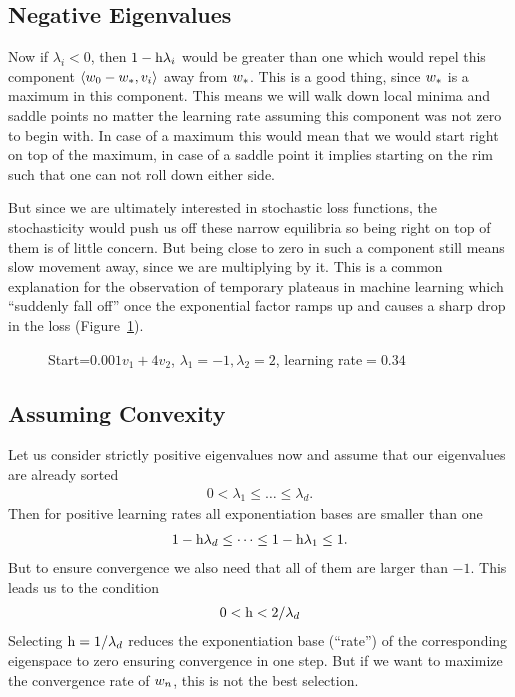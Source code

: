 \subsection{Negative Eigenvalues}\label{subsec: Negative Eigenvalues}

Now if \(\lambda_i<0\), then \(1-\text{h}\lambda_i\) would be greater
than one which would repel this component \(\langle w_0 - w_*,
v_i\rangle\) away from \(w_*\). This is a good thing, since \(w_*\)
is a maximum in this component. This means we will walk down local minima and
saddle points no matter the learning rate assuming  this component  was not
zero to begin with. In case of a maximum this would mean that we would start
right on top of the maximum, in case of a saddle point it implies starting on
the rim such that one can not roll down either side.

But since we are ultimately interested in stochastic loss functions, the
stochasticity would push us off these narrow equilibria so being right on
top of them is of little concern. But being close to zero in such a component
still means slow movement away, since we are multiplying by it. This is a
common explanation for the observation of temporary plateaus in machine learning
which ``suddenly fall off'' once the exponential factor ramps up and causes a
sharp drop in the loss (Figure~\ref{fig: visualize saddlepoint gd}).
%
\begin{figure}[h]
	\centering
	\def\svgwidth{1\textwidth}
	
	\caption{Start=\(0.001v_1+4v_2\), \(\lambda_1=-1, \lambda_2=2\), learning rate\(=0.34\)}
	\label{fig: visualize saddlepoint gd}
\end{figure}

\subsection{Assuming Convexity}

Let us consider strictly positive eigenvalues now and assume that our
eigenvalues are already sorted
%
\begin{align}
	0 < \lambda_1 \le \dots \le \lambda_d.
\end{align}
%
Then for positive learning rates all exponentiation bases are smaller than one
%
\begin{align*}
	1-\text{h}\lambda_d \le \dots \le 1-\text{h}\lambda_1 \le 1.
\end{align*}
%
But to ensure convergence we also need that all of them are larger than \(-1\).
This leads us to the condition
\begin{align}\label{eq: learning rate restriction (eigenvalue)}
	0< \text{h} < 2/\lambda_d
\end{align}
%
Selecting \(\text{h} = 1/\lambda_d\) reduces the exponentiation base (``rate'') of the
corresponding eigenspace to zero ensuring convergence in one step.
But if we want to maximize the convergence rate of \(w_n\), this is not
the best selection.

